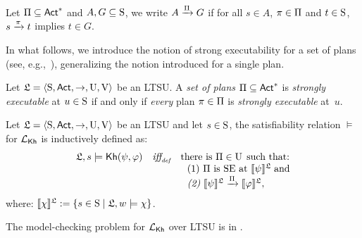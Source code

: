     \medskip
    
    \begin{definition}
       Let $\plans \subseteq \Act^*$ and $A,G \subseteq \S$, we write $A\reach{\plans} G$ if for all $s\in A$, $\plan\in\plans$ and $t\in \S$,  $s \reach{\plan} t$ implies $t\in G$. 
    \end{definition}
    
    \medskip
    
    In what follows, we introduce the notion of strong executability for a set of plans (see, e.g.,~\cite{AFSVQ23}), generalizing the notion introduced for a single plan.
    
    \medskip
    
    
    \begin{definition}\label{def:plans-exec}
    Let $\model=\tup{\S,\Act,\ra,\Unc,\V}$ be an LTSU. A \emph{set of plans} $\plans \subseteq \Act^*$ is \emph{strongly executable} at $u \in \S$ if and only if \emph{every} plan $\plan \in \plans$ is \emph{strongly executable} at~$u$.
    \end{definition}

    \begin{definition} \label{def:semantics-kh-uncertain}
        Let $\model = \tup{\S,\Act,\ra,\Unc,\V}$ be an LTSU and let $s\in\S$, the satisfiability relation $\models$ for $\Khlogic$ is inductively defined as:
        \[
        \begin{array}{l@{\ \ \ }c@{\ \ \  }l}
        \model, s \models \kh(\psi,\varphi) & \iffdef & \text{there is } \plans \in \Unc \;\text{such that:} \\
        & & \ \ \text{\rm (1)} \ \plans \text{ is SE at }  \truthset{\model}{\psi}\; \text{and} \\
        & & \ \ \text{\em (2)} \ \truthset{\model}{\psi} \reach{\plans} \truthset{\model}{\varphi}, 
        \end{array}
        \]      where: $\truthset{\model}{\chi} := \csetsc{s\in\S}{\model,w\models\chi}$. 
    \end{definition}
    

    \begin{proposition}
        The model-checking problem for $\Khlogic$ over LTSU is in \PTIME.
    \end{proposition}
